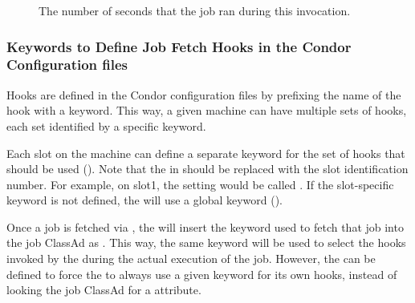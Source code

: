 \begin{itemize}
\begin{description}
\item[]
  The number of seconds that the job ran during this invocation.
\end{description}


% 

\end{itemize}

\subsubsection{\label{sec:job-hooks-keywords}
Keywords to Define Job Fetch Hooks in the Condor Configuration files }

Hooks are defined in the Condor configuration files by prefixing
the name of the hook with a keyword.
This way, a given machine can have multiple sets of hooks, each set
identified by a specific keyword.

Each slot on the machine can define a separate keyword for the set
of hooks that should be used ().
Note that the  in  should be replaced with the slot
identification number. 
For example, on slot1, the setting would be
called .
If the slot-specific keyword is not defined, the  will
use a global keyword ().

Once a job is fetched via , the
 will insert the keyword used to fetch that job into
the job ClassAd as .
This way, the same keyword will be used to select the hooks invoked by
the  during the actual execution of the job.
However, the  can be defined to
force the  to always use a given keyword for its own
hooks, instead of looking the job ClassAd for a 
attribute.

